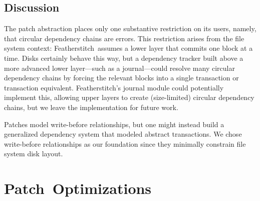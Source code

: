 \documentclass[9pt,twocolumn,letterpaper]{article}
\newcommand{\Kudos}{Featherstitch}
\newcommand{\Featherstitch}{\Kudos}
\newcommand{\Patch}{Patch}
\begin{document}
\subsection{Discussion}

The patch abstraction places only one substantive restriction on its users,
 namely, that circular dependency chains are errors.
%
This restriction arises from the file system context: \Kudos\ assumes a
 lower layer that commits one block at a time.
%
Disks certainly behave this way, but a dependency tracker built above a
 more advanced lower layer---such as a journal---could resolve many
 circular dependency chains by forcing the relevant blocks into a single
 transaction or transaction equivalent.
%
\Featherstitch's journal module could potentially implement this, allowing
 upper layers to create (size-limited) circular dependency chains, but we
 leave the implementation for future work.

Patches model write-before relationships, but one might instead build a
 generalized dependency system that modeled abstract
 transactions.
%
We chose write-before relationships as our foundation since they minimally
 constrain file system disk layout.


\section{\Patch\ Optimizations}
\label{sec:patch:optimizations}

\begin{comment}
A naive \Featherstitch\ implementation 
%
allows file system modules to define and modify consistency-preserving
orderings, and allows applications to add consistency requirements of their
own (using the interface described below).
%
But although all this is relatively easy, it performs badly.
\end{comment}
\end{document}
